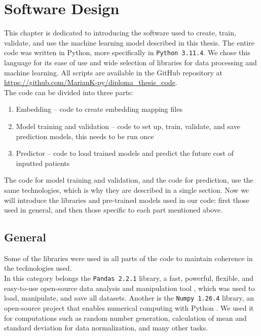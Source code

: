 
\chapter{Software Design} \label{chap:softwaredesign}

This chapter is dedicated to introducing the software used to create, train, validate, and use the machine learning model described in this thesis. The entire code was written in Python, more specifically in \texttt{Python 3.11.4}. We chose this language for its ease of use and wide selection of libraries for data processing and machine learning. All scripts are available in the GitHub repository at \url{https://github.com/MarianK-py/diploma_thesis_code}.
\\

The code can be divided into three parts:

\begin{enumerate}
	\item Embedding – code to create embedding mapping files
	\item Model training and validation – code to set up, train, validate, and save prediction models, this needs to be run once
	\item Predictor – code to load trained models and predict the future cost of inputted patients
\end{enumerate}

The code for model training and validation, and the code for prediction, use the same technologies, which is why they are described in a single section. Now we will introduce the libraries and pre-trained models used in our code: first those used in general, and then those specific to each part mentioned above.

\section{General}

Some of the libraries were used in all parts of the code to maintain coherence in the technologies used.
\\

In this category belongs the \texttt{Pandas 2.2.1} library, a fast, powerful, flexible, and easy-to-use open-source data analysis and manipulation tool \cite{pandas}, which was used to load, manipulate, and save all datasets. Another is the \texttt{Numpy 1.26.4} library, an open-source project that enables numerical computing with Python \cite{numpy}. We used it for computations such as random number generation, calculation of mean and standard deviation for data normalization, and many other tasks.



